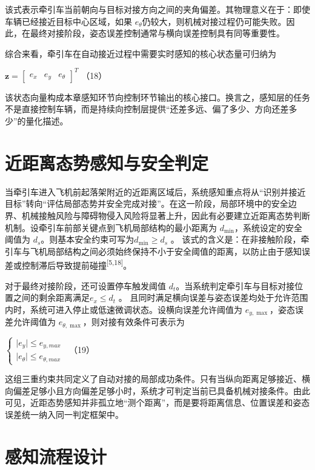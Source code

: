 该式表示牵引车当前朝向与目标对接方向之间的夹角偏差。其物理意义在于：即使车辆已经接近目标中心区域，如果
\(e_{\theta}\)仍较大，则机械对接过程仍可能失败。因此，在最终对接阶段，姿态误差控制通常与横向误差控制具有同等重要性。

综合来看，牵引车在自动接近过程中需要实时感知的核心状态量可归纳为

\(\mathbf{z} = \begin{bmatrix}
e_{x} & e_{y} & e_{\theta}
\end{bmatrix}^{T}\) （18）

该状态向量构成本章感知环节向控制环节输出的核心接口。换言之，感知层的任务不是直接控制车辆，而是持续向控制层提供``还差多远、偏了多少、方向还差多少''的量化描述。

\section{近距离态势感知与安全判定}

当牵引车进入飞机前起落架附近的近距离区域后，系统感知重点将从``识别并接近目标''转向``评估局部态势并安全完成对接''。在这一阶段，局部环境中的安全边界、机械接触风险与障碍物侵入风险将显著上升，因此有必要建立近距离态势判断机制。设牵引车前部关键点到飞机局部结构的最小距离为
\(d_{\min}\)，系统设定的安全阈值为
\(d_{s}\)。则基本安全约束可写为\(d_{\min} \geq d_{s}\) 。\(
\)
该式的含义是：在非接触阶段，牵引车与飞机局部结构之间必须始终保持不小于安全阈值的距离，以防止由于感知误差或控制滞后导致提前碰撞\textsuperscript{[5,18]}。

对于最终对接阶段，还可设置停车触发阈值
\(d_{t}\)。当系统判定牵引车与目标对接位置之间的剩余距离满足\(e_{x} \leq d_{t}\)
。\(
\)
且同时满足横向误差与姿态误差均处于允许范围内时，系统可进入停止或低速微调状态。设横向误差允许阈值为
\(e_{y,\max}\)，姿态误差允许阈值为
\(e_{\theta,\max}\)，则对接有效条件可表示为

\(\left\{ \begin{array}{r}
 \mid e_{y} \mid \leq e_{y,max} \\
 \mid e_{\theta} \mid \leq e_{\theta,max}
\end{array} \right.\ \) （19）

这组三重约束共同定义了自动对接的局部成功条件。只有当纵向距离足够接近、横向偏差足够小且方向偏差足够小时，系统才可判定当前已具备机械对接条件。由此可见，近距态势感知并非孤立地``测个距离''，而是要将距离信息、位置误差和姿态误差统一纳入同一判定框架中。

\section{感知流程设计}

